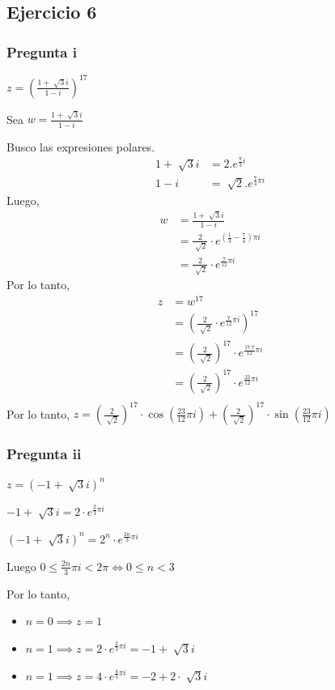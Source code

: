 \subsection{Ejercicio 6}

\subsubsection{Pregunta i}

$ z = (\frac{1+\sqrt[]{3}i}{1-i})^{17} $

Sea $ w = \frac{1+\sqrt[]{3}i}{1-i} $

Busco las expresiones polares.
\begin{align*}
    1+\sqrt[]{3}i &= 2. e^{\frac{\pi}{3}i} \\
    1-i &= \sqrt[]{2}. e^{\frac{7}{4}\pi i}
\end{align*}
Luego,
\begin{align*}
    w &= \frac{1+\sqrt[]{3}i}{1-i} \\
    &= \frac{2}{\sqrt[]{2}} \cdot e^{(\frac{1}{3} - \frac{7}{4})\pi i} \\
    &= \frac{2}{\sqrt[]{2}} \cdot e^{\frac{7}{12}\pi i}
\end{align*}
Por lo tanto,
\begin{align*}
    z &= w^{17} \\
    &= \left(\frac{2}{\sqrt[]{2}} \cdot e^{\frac{7}{12}\pi i}\right)^{17} \\
    &= \left(\frac{2}{\sqrt[]{2}}\right)^{17} \cdot e^{\frac{17.7}{12}\pi i} \\
    &= \left(\frac{2}{\sqrt[]{2}}\right)^{17} \cdot e^{\frac{23}{12}\pi i} \\
\end{align*}
Por lo tanto,
$ z = \left(\frac{2}{\sqrt[]{2}}\right)^{17} \cdot \cos(\frac{23}{12}\pi i) + \left(\frac{2}{\sqrt[]{2}}\right)^{17} \cdot \sin(\frac{23}{12}\pi i) $

\subsubsection{Pregunta ii}

$ z = (-1+\sqrt[]{3}i)^{n} $

$ -1+\sqrt[]{3}i = 2\cdot e^{\frac{2}{3}\pi i} $

$ (-1+\sqrt[]{3}i)^{n} = 2^n \cdot e^{\frac{2n}{3}\pi i} $

Luego $ 0 \leq \frac{2n}{3}\pi i < 2\pi \iff 0 \leq n < 3 $

Por lo tanto,
\begin{itemize}
    \item $ n = 0 \implies z = 1 $
    \item $ n = 1 \implies z = 2\cdot e^{\frac{2}{3}\pi i} = -1+\sqrt[]{3}i $
    \item $ n = 1 \implies z = 4\cdot e^{\frac{4}{3}\pi i} = -2+ 2 \cdot \sqrt[]{3}i $
\end{itemize}

